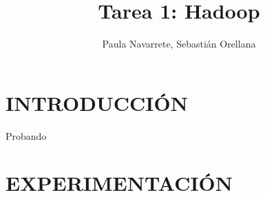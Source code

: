 \documentclass[letterpaper, 10 pt, conference]{ieeeconf}  %
\title{\LARGE \bf
Tarea 1: Hadoop
}
\author{Paula Navarrete, Sebastián Orellana}
\begin{document}
\maketitle
\thispagestyle{empty}
\pagestyle{empty}



\section{INTRODUCCIÓN}
Probando

\section{EXPERIMENTACIÓN}
\end{document}
